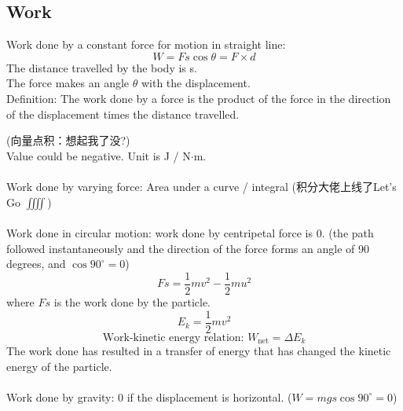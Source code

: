 \documentclass[a4paper,12pt]{article}
\begin{document}
\subsection{Work}
Work done by a constant force for motion in straight line:
\[W=Fs\cos\theta=F\times d\]
The distance travelled by the body is s. \\The force makes an angle $\theta$ with the displacement. \\Definition: The work done by a force is the product of the force in the direction of the displacement times the distance travelled.
\begin{center}
\end{center}
(向量点积：想起我了没?)\\
Value could be negative. Unit is J / N$\cdot$m.\\\\
Work done by varying force: Area under a curve / integral (积分大佬上线了Let's Go $\displaystyle\iiiint$)\\\\
Work done in circular motion: work done by centripetal force is 0. (the path followed instantaneously and the direction of the force forms an angle of 90 degrees, and $\cos 90^\circ=0$)
\[Fs=\dfrac{1}{2}mv^2-\dfrac{1}{2}mu^2\]
where $Fs$ is the work done by the particle.
\[E_k=\dfrac{1}{2}mv^2\]
\[\text{Work-kinetic energy relation: }W_\text{net}=\Delta E_k\]
The work done has resulted in a transfer of energy that has changed the kinetic energy of the particle.\\\\
Work done by gravity: 0 if the displacement is horizontal. ($W=mgs\cos 90^\circ=0$)\\
\end{document}
